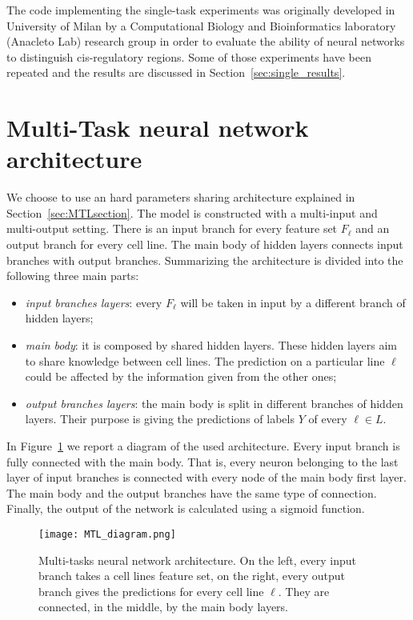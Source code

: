 The code implementing the single-task experiments was originally developed in University of Milan by a Computational Biology and Bioinformatics laboratory (Anacleto Lab) research group in order to evaluate the ability of neural networks to distinguish cis-regulatory regions. Some of those experiments have been repeated and the results are discussed in Section~\ref{sec:single_results}. 

\section{Multi-Task neural network architecture} \label{sec:exp_setup_multitask}
We choose to use an hard parameters sharing architecture explained in Section~\ref{sec:MTLsection}. The model is constructed with a multi-input and multi-output setting. There is an input branch for every feature set $F_\ell$ and an output branch for every cell line. The main body of hidden layers connects input branches with output branches. Summarizing the architecture is divided into the following three main parts:
\begin{itemize}
    \item \textit{input branches layers}: every $F_\ell$ will be taken in input by a different branch of hidden layers;
    \item \textit{main body}: it is composed by shared hidden layers. These hidden layers aim to share knowledge between cell lines. The prediction on a particular line $\ell$ could be affected by the information given from the other ones;
    \item \textit{output branches layers}: the main body is split in different branches of hidden layers. Their purpose is giving the predictions of labels $Y$ of every $\ell \in L$.
\end{itemize}
In Figure~\ref{fig:MTL_arch_diagram} we report a diagram of the used architecture. Every input branch is fully connected with the main body. That is, every neuron belonging to the last layer of input branches is connected with every node of the main body first layer. The main body and the output branches have the same type of connection. Finally, the output of the network is calculated using a sigmoid function. 
\begin{figure}[ht]
\centering
\texttt{[image: MTL\_diagram.png]}
\caption{Multi-tasks neural network architecture. On the left, every input branch takes a cell lines feature set, on the right, every output branch gives the predictions for every cell line $\ell$. They are connected, in the middle, by the main body layers. } 
\label{fig:MTL_arch_diagram}
\end{figure}
